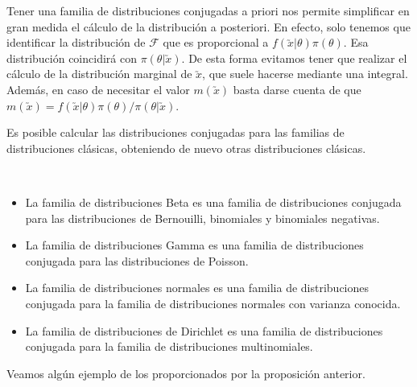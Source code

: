 Tener una familia de distribuciones conjugadas a priori nos permite simplificar en gran medida el cálculo de la distribución a posteriori. En efecto, solo tenemos que identificar la distribución de $\mathcal{F}$ que es proporcional a $f(\utilde{x}|\theta)\pi(\theta)$. Esa distribución coincidirá con $\pi(\theta | \utilde{x})$. De esta forma evitamos tener que realizar el cálculo de la distribución marginal de $\utilde{x}$, que suele hacerse mediante una integral. Además, en caso de necesitar el valor $m(\utilde{x})$ basta darse cuenta de que $m(\utilde{x}) = f(\utilde{x}|\theta)\pi(\theta) / \pi(\theta|\utilde{x})$.


Es posible calcular las distribuciones conjugadas para las familias de distribuciones clásicas, obteniendo de nuevo otras distribuciones clásicas.

\begin{prop} ~\\
    \vspace*{-6mm}
	\begin{itemize}
		\item La familia de distribuciones Beta es una familia de distribuciones conjugada para las distribuciones de Bernouilli, binomiales y binomiales negativas.

		\item La familia de distribuciones Gamma es una familia de distribuciones conjugada para las distribuciones de Poisson.%

		\item La familia de distribuciones normales es una familia de distribuciones conjugada para la familia de distribuciones normales con varianza conocida.

		\item La familia de distribuciones de Dirichlet es una familia de distribuciones conjugada para la familia de distribuciones multinomiales.
	\end{itemize}
\end{prop}

Veamos algún ejemplo de los proporcionados por la proposición anterior.

